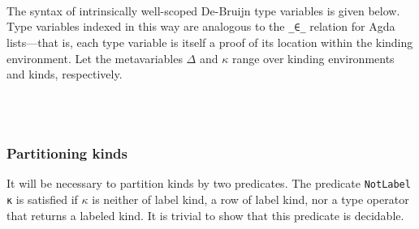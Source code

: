 \documentclass[authoryear, acmsmall, screen, review, nonacm]{acmart} %
\begin{document}
\begin{code}[hide]%
\>[0]\<%
\\
\>[0][@{}l@{\AgdaIndent{0}}]%
\>[2]\<%
\\
\>[2][@{}l@{\AgdaIndent{0}}]%
\>[4]\AgdaSpace{}%
\AgdaSpace{}%
\AgdaSpace{}%
\AgdaSpace{}%
\AgdaSymbol{:}\AgdaSpace{}%
\<%
\\
%
\>[4]\AgdaSpace{}%
\AgdaSpace{}%
\AgdaSpace{}%
\AgdaSymbol{:}\AgdaSpace{}%
\<%
\end{code}

The syntax of intrinsically well-scoped De-Bruijn type variables is given below. Type variables indexed in this way are analogous to the \verb!_∈_! relation for Agda lists---that is, each type variable is itself a proof of its location within the kinding environment. Let the metavariables $\Delta$ and $\kappa$ range over kinding environments and kinds, respectively. 

\begin{code}%
\>[0]\AgdaSpace{}%
\AgdaSpace{}%
\AgdaSymbol{:}\AgdaSpace{}%
\AgdaSpace{}%
\AgdaSpace{}%
\AgdaSpace{}%
\AgdaSpace{}%
\AgdaSpace{}%
\<%
\\
\>[0][@{}l@{\AgdaIndent{0}}]%
\>[2]\AgdaSpace{}%
\AgdaSymbol{:}\AgdaSpace{}%
\AgdaSpace{}%
\AgdaSymbol{(}\AgdaSpace{}%
\AgdaOperator{\AgdaInductiveConstructor{,,}}\AgdaSpace{}%
\AgdaSymbol{)}\AgdaSpace{}%
\<%
\\
%
\>[2]\AgdaSpace{}%
\AgdaSymbol{:}\AgdaSpace{}%
\AgdaSpace{}%
\AgdaSpace{}%
\AgdaSpace{}%
\AgdaSpace{}%
\AgdaSpace{}%
\AgdaSymbol{(}\AgdaSpace{}%
\AgdaOperator{\AgdaInductiveConstructor{,,}}\AgdaSpace{}%
\AgdaSymbol{)}\AgdaSpace{}%
\<%
\end{code}

\subsubsection{Partitioning kinds} It will be necessary to partition kinds by two predicates. The predicate \verb!NotLabel κ! is satisfied if $\kappa$ is neither of label kind, a row of label kind, nor a type operator that returns a labeled kind. It is trivial to show that this predicate is decidable.
\end{document}
